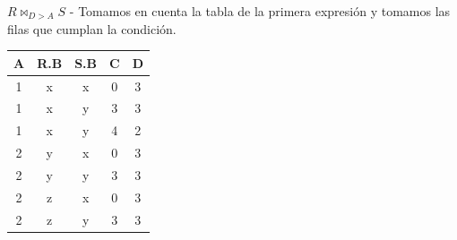 \item $R \bowtie_{D > A} S$ - Tomamos en cuenta la tabla de la primera expresión y tomamos las filas que cumplan la condición.

\begin{center}
\begin{tabular}{ccccc}
\toprule
\textbf{A} & \textbf{R.B} & \textbf{S.B} & \textbf{C} & \textbf{D} \\
\midrule
1 & x & x & 0 & 3 \\
1 & x & y & 3 & 3 \\
1 & x & y & 4 & 2 \\
2 & y & x & 0 & 3 \\
2 & y & y & 3 & 3 \\
2 & z & x & 0 & 3 \\
2 & z & y & 3 & 3 \\
\bottomrule
\end{tabular}
\end{center}
